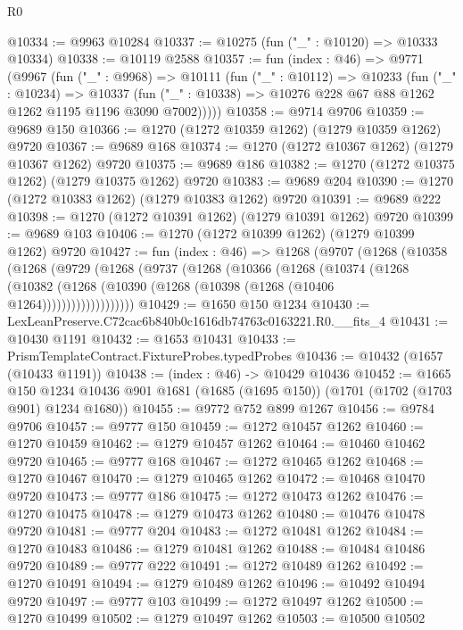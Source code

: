 \begin{lexlean}{R0}
\begin{coremodule}
@10334 := @9963 @10284
@10337 := @10275 (fun ("_" : @10120) => @10333 @10334)
@10338 := @10119 @2588
@10357 := fun (index : @46) =>
  @9771
    (@9967
      (fun ("_" : @9968) =>
      @10111
        (fun ("_" : @10112) =>
        @10233
          (fun ("_" : @10234) =>
          @10337 (fun ("_" : @10338) => @10276 @228 @67 @88 @1262 @1262 @1195 @1196 @3090 @7002)))))
@10358 := @9714 @9706
@10359 := @9689 @150
@10366 := @1270 (@1272 @10359 @1262) (@1279 @10359 @1262) @9720
@10367 := @9689 @168
@10374 := @1270 (@1272 @10367 @1262) (@1279 @10367 @1262) @9720
@10375 := @9689 @186
@10382 := @1270 (@1272 @10375 @1262) (@1279 @10375 @1262) @9720
@10383 := @9689 @204
@10390 := @1270 (@1272 @10383 @1262) (@1279 @10383 @1262) @9720
@10391 := @9689 @222
@10398 := @1270 (@1272 @10391 @1262) (@1279 @10391 @1262) @9720
@10399 := @9689 @103
@10406 := @1270 (@1272 @10399 @1262) (@1279 @10399 @1262) @9720
@10427 := fun (index : @46) =>
  @1268
    (@9707
      (@1268
        (@10358
          (@1268
            (@9729
              (@1268
                (@9737
                  (@1268
                    (@10366
                      (@1268
                        (@10374
                          (@1268
                            (@10382
                              (@1268 (@10390 (@1268 (@10398 (@1268 (@10406 @1264)))))))))))))))))))
@10429 := @1650 @150 @1234
@10430 := LexLeanPreserve.C72cac6b840b0c1616db74763c0163221.R0.__fits_4
@10431 := @10430 @1191
@10432 := @1653 @10431
@10433 := PrismTemplateContract.FixtureProbes.typedProbes
@10436 := @10432 (@1657 (@10433 @1191))
@10438 := (index : @46) -> @10429 @10436
@10452 := @1665
    @150
    @1234
    @10436
    @901
    @1681
    (@1685 (@1695 @150))
    (@1701 (@1702 (@1703 @901) @1234 @1680))
@10455 := @9772 @752 @899 @1267
@10456 := @9784 @9706
@10457 := @9777 @150
@10459 := @1272 @10457 @1262
@10460 := @1270 @10459
@10462 := @1279 @10457 @1262
@10464 := @10460 @10462 @9720
@10465 := @9777 @168
@10467 := @1272 @10465 @1262
@10468 := @1270 @10467
@10470 := @1279 @10465 @1262
@10472 := @10468 @10470 @9720
@10473 := @9777 @186
@10475 := @1272 @10473 @1262
@10476 := @1270 @10475
@10478 := @1279 @10473 @1262
@10480 := @10476 @10478 @9720
@10481 := @9777 @204
@10483 := @1272 @10481 @1262
@10484 := @1270 @10483
@10486 := @1279 @10481 @1262
@10488 := @10484 @10486 @9720
@10489 := @9777 @222
@10491 := @1272 @10489 @1262
@10492 := @1270 @10491
@10494 := @1279 @10489 @1262
@10496 := @10492 @10494 @9720
@10497 := @9777 @103
@10499 := @1272 @10497 @1262
@10500 := @1270 @10499
@10502 := @1279 @10497 @1262
@10503 := @10500 @10502

\end{coremodule}
\end{lexlean}
